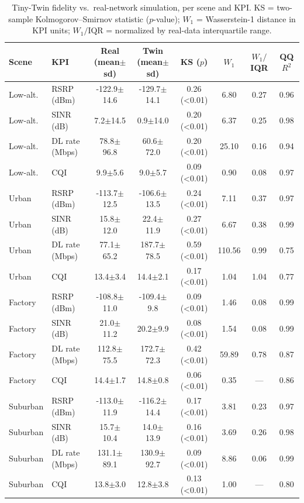 \begin{table}[t]
\centering
\caption{Tiny-Twin fidelity vs.\ real-network simulation, per scene and KPI. KS = two-sample Kolmogorov--Smirnov statistic ($p$-value); $W_1$ = Wasserstein-1 distance in KPI units; $W_1/\mathrm{IQR}$ = normalized by real-data interquartile range.}
\label{tab:fidelity}
\small
\begin{tabular}{llcccccc}
\toprule
Scene & KPI & Real (mean$\pm$sd) & Twin (mean$\pm$sd) & KS ($p$) & $W_1$ & $W_1/$IQR & QQ $R^2$ \\
\midrule
Low-alt. & RSRP (dBm) & -122.9$\pm$14.6 & -129.7$\pm$14.1 & 0.26 (<0.01) & 6.80 & 0.27 & 0.96 \\
Low-alt. & SINR (dB) & 7.2$\pm$14.5 & 0.9$\pm$14.0 & 0.20 (<0.01) & 6.37 & 0.25 & 0.98 \\
Low-alt. & DL rate (Mbps) & 78.8$\pm$96.8 & 60.6$\pm$72.0 & 0.20 (<0.01) & 25.10 & 0.16 & 0.94 \\
Low-alt. & CQI & 9.9$\pm$5.6 & 9.0$\pm$5.7 & 0.09 (<0.01) & 0.90 & 0.08 & 0.97 \\
Urban & RSRP (dBm) & -113.7$\pm$12.5 & -106.6$\pm$13.5 & 0.24 (<0.01) & 7.11 & 0.37 & 0.97 \\
Urban & SINR (dB) & 15.8$\pm$12.0 & 22.4$\pm$11.9 & 0.27 (<0.01) & 6.67 & 0.38 & 0.99 \\
Urban & DL rate (Mbps) & 77.1$\pm$65.2 & 187.7$\pm$78.5 & 0.59 (<0.01) & 110.56 & 0.99 & 0.75 \\
Urban & CQI & 13.4$\pm$3.4 & 14.4$\pm$2.1 & 0.17 (<0.01) & 1.04 & 1.04 & 0.77 \\
Factory & RSRP (dBm) & -108.8$\pm$11.0 & -109.4$\pm$9.8 & 0.09 (<0.01) & 1.46 & 0.08 & 0.99 \\
Factory & SINR (dB) & 21.0$\pm$11.2 & 20.2$\pm$9.9 & 0.08 (<0.01) & 1.54 & 0.08 & 0.99 \\
Factory & DL rate (Mbps) & 112.8$\pm$75.5 & 172.7$\pm$72.3 & 0.42 (<0.01) & 59.89 & 0.78 & 0.87 \\
Factory & CQI & 14.4$\pm$1.7 & 14.8$\pm$0.8 & 0.06 (<0.01) & 0.35 & --- & 0.86 \\
Suburban & RSRP (dBm) & -113.0$\pm$11.9 & -116.2$\pm$14.4 & 0.17 (<0.01) & 3.81 & 0.23 & 0.97 \\
Suburban & SINR (dB) & 15.7$\pm$10.4 & 14.0$\pm$13.9 & 0.16 (<0.01) & 3.69 & 0.26 & 0.98 \\
Suburban & DL rate (Mbps) & 131.1$\pm$89.1 & 130.9$\pm$92.7 & 0.09 (<0.01) & 8.86 & 0.06 & 0.99 \\
Suburban & CQI & 13.8$\pm$3.0 & 12.8$\pm$3.8 & 0.13 (<0.01) & 1.00 & --- & 0.80 \\
\bottomrule
\end{tabular}
\end{table}
